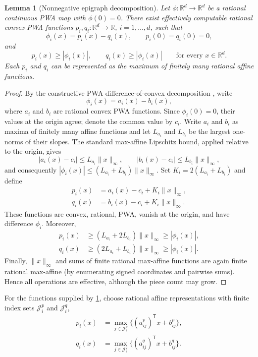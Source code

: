 \documentclass{IEEEtran}
\newtheorem{lemma}[theorem]{Lemma}
\theoremstyle{remark}
\newcommand{\R}{\mathbb{R}}
\begin{document}
\begin{lemma}[Nonnegative epigraph decomposition]
\label{lem:epigraph-decomposition}
Let $\phi:\R^d\to\R^d$ be a rational continuous PWA map with $\phi(0)=0$.
There exist effectively computable rational convex PWA functions
$p_i,q_i:\R^d\to\R$, $i=1,\ldots,d$, such that
\[
  \phi_i(x)=p_i(x)-q_i(x),\qquad
  p_i(0)=q_i(0)=0,
\]
and
\[
  p_i(x)\ge |\phi_i(x)|,
  \qquad q_i(x)\ge |\phi_i(x)|
  \qquad\text{for every }x\in\R^d.
\]
Each $p_i$ and $q_i$ can be represented as the maximum of finitely many
rational affine functions.
\end{lemma}

\begin{proof}
By the constructive PWA difference-of-convex decomposition
\cite[Lemma~4]{HempelEtAl2013}, write
\[
  \phi_i(x)=a_i(x)-b_i(x),
\]
where $a_i$ and $b_i$ are rational convex PWA functions.  Since
$\phi_i(0)=0$, their values at the origin agree; denote the common value by
$c_i$.  Write $a_i$ and $b_i$ as maxima of finitely many affine functions and
let $L_{a_i}$ and $L_{b_i}$ be the largest one-norms of their slopes.  The
standard max-affine Lipschitz bound, applied relative to the origin, gives
\[
  |a_i(x)-c_i|\le L_{a_i}\|x\|_\infty,
  \qquad
  |b_i(x)-c_i|\le L_{b_i}\|x\|_\infty,
\]
and consequently
$|\phi_i(x)|\le(L_{a_i}+L_{b_i})\|x\|_\infty$.
Set $K_i=2(L_{a_i}+L_{b_i})$ and define
\begin{align*}
  p_i(x)&=a_i(x)-c_i+K_i\|x\|_\infty,\\
  q_i(x)&=b_i(x)-c_i+K_i\|x\|_\infty.
\end{align*}
These functions are convex, rational, PWA, vanish at the origin, and have
difference $\phi_i$.  Moreover,
\begin{align*}
 p_i(x)&\ge (L_{a_i}+2L_{b_i})\|x\|_\infty
          \ge |\phi_i(x)|,\\
 q_i(x)&\ge (2L_{a_i}+L_{b_i})\|x\|_\infty
          \ge |\phi_i(x)|.
\end{align*}
Finally, $\|x\|_\infty$ and sums of finite rational max-affine functions are
again finite rational max-affine (by enumerating signed coordinates and
pairwise sums).  Hence all operations are effective, although the piece count
may grow.
\end{proof}

For the functions supplied by \cref{lem:epigraph-decomposition}, choose rational
affine representations with finite index sets $\mathcal J_i^p$ and
$\mathcal J_i^q$,
\begin{align*}
 p_i(x)&=\max_{j\in\mathcal J_i^p}
       \{(a_{ij}^p)^{\mathsf T}x+b_{ij}^p\},\\
 q_i(x)&=\max_{j\in\mathcal J_i^q}
       \{(a_{ij}^q)^{\mathsf T}x+b_{ij}^q\}.
\end{align*}
\end{document}

